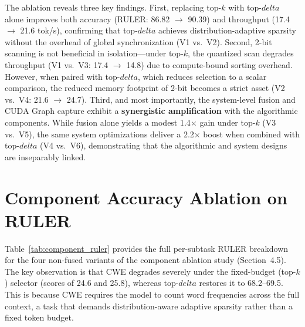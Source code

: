 \documentclass[]{mosi}
\def\delta{delta}%
\theoremstyle{plain}
\theoremstyle{definition}
\theoremstyle{remark}
\begin{document}
The ablation reveals three key findings. First, replacing top-$k$ with top-$\delta$ alone improves both accuracy (RULER: 86.82 $\rightarrow$ 90.39) and throughput (17.4 $\rightarrow$ 21.6 tok/s), confirming that top-$\delta$ achieves distribution-adaptive sparsity without the overhead of global synchronization (V1 vs.\ V2). Second, 2-bit scanning is not beneficial in isolation---under top-$k$, the quantized scan degrades throughput (V1 vs.\ V3: 17.4 $\rightarrow$ 14.8) due to compute-bound sorting overhead. However, when paired with top-$\delta$, which reduces selection to a scalar comparison, the reduced memory footprint of 2-bit becomes a strict asset (V2 vs.\ V4: 21.6 $\rightarrow$ 24.7). Third, and most importantly, the system-level fusion and CUDA Graph capture exhibit a \textbf{synergistic amplification} with the algorithmic components. While fusion alone yields a modest 1.4$\times$ gain under top-$k$ (V3 vs.\ V5), the same system optimizations deliver a 2.2$\times$ boost when combined with top-$\delta$ (V4 vs.\ V6), demonstrating that the algorithmic and system designs are inseparably linked.

\section{Component Accuracy Ablation on RULER}
\label{app:component_ruler}

Table~\ref{tab:component_ruler} provides the full per-subtask RULER breakdown for the four non-fused variants of the component ablation study (Section~4.5). The key observation is that CWE degrades severely under the fixed-budget (top-$k$) selector (scores of 24.6 and 25.8), whereas top-$\delta$ restores it to 68.2--69.5. This is because CWE requires the model to count word frequencies across the full context, a task that demands distribution-aware adaptive sparsity rather than a fixed token budget.
\end{document}
